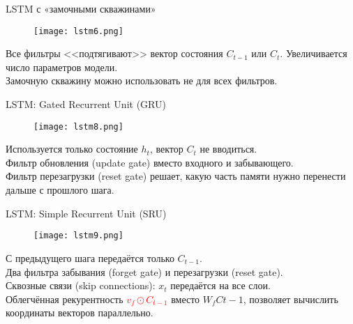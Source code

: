 \documentclass[11pt]{beamer}
\begin{document}
 \begin{frame}{LSTM с «замочными скважинами»}
      \begin{figure}
	        \centering
	        \texttt{[image: lstm6.png]}
	        
	    \end{figure}
     Все фильтры <<подтягивают>> вектор состояния $C_{t-1}$ или $C_t$.
     Увеличивается число параметров модели.\\
     Замочную скважину можно использовать не для всех фильтров.
 \end{frame}

 \begin{frame}{LSTM: Gated Recurrent Unit (GRU)}
      \begin{figure}
	        \centering
	        \texttt{[image: lstm8.png]}
	        
	    \end{figure}
     Используется только состояние $h_t$, вектор $C_t$ не вводиться.\\
     Фильтр обновления (update gate) вместо входного и забывающего.\\
     Фильтр перезагрузки (reset gate) решает, какую часть памяти нужно перенести дальше с прошлого шага.
 \end{frame}
 \begin{frame}{LSTM: Simple Recurrent Unit (SRU)}
      \begin{figure}
	        \centering
	        \texttt{[image: lstm9.png]}
	        
	    \end{figure}
     С предыдущего шага передаётся только $C_{t-1}$.
     \\ Два фильтра забывания (forget gate) и перезагрузки (reset gate).\\
     Сквозные связи (skip connections): $x_t$ передаётся на все слои.\\
     Облегчённая рекурентность \textcolor{red}{$v_f\odot C_{t-1}$} вместо $W_f C{t-1}$, позволяет вычислить координаты векторов параллельно.
 \end{frame}
\end{document}

